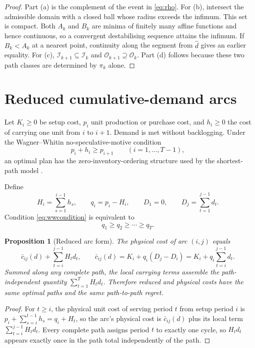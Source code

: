 \documentclass[11pt]{article}
\newtheorem{proposition}[theorem]{Proposition}
\theoremstyle{definition}
\newcommand{\cI}{\mathcal{I}}
\newcommand{\cO}{\mathcal{O}}
\newcommand{\dhat}{\widehat d}
\begin{document}
\begin{proof}
Part (a) is the complement of the event in \eqref{eq:rho}. For (b), intersect the admissible domain with a closed ball whose radius exceeds the infimum. This set is compact. Both $A_k$ and $B_k$ are minima of finitely many affine functions and hence continuous, so a convergent destabilising sequence attains the infimum. If $B_k<A_k$ at a nearest point, continuity along the segment from $\dhat$ gives an earlier equality. For (c), $\cI_{k+1}\subseteq\cI_k$ and $\cO_{k+1}\supseteq\cO_k$. Part (d) follows because these two path classes are determined by $\pi_k$ alone.
\end{proof}

\section{Reduced cumulative-demand arcs}\label{sec:reduction}

Let $K_i\ge0$ be setup cost, $p_i$ unit production or purchase cost, and $h_i\ge0$ the cost of carrying one unit from $i$ to $i+1$. Demand is met without backlogging. Under the Wagner--Whitin no-speculative-motive condition
\begin{equation}\label{eq:wwcondition}
p_i+h_i\ge p_{i+1}\qquad(i=1,\ldots,T-1),
\end{equation}
an optimal plan has the zero-inventory-ordering structure used by the shortest-path model \parencite{WagnerWhitin1958}.

Define
\[
H_i=\sum_{s=1}^{i-1}h_s,
\qquad q_i=p_i-H_i,
\qquad D_1=0,
\qquad D_j=\sum_{t=1}^{j-1}d_t.
\]
Condition \eqref{eq:wwcondition} is equivalent to
\begin{equation}\label{eq:orderedq}
q_1\ge q_2\ge\cdots\ge q_T.
\end{equation}

\begin{proposition}[Reduced arc form]\label{prop:reduction}
The physical cost of arc $(i,j)$ equals
\begin{equation}\label{eq:reducedarc}
\bar c_{ij}(d)+\sum_{t=i}^{j-1}H_td_t,
\qquad
\bar c_{ij}(d)=K_i+q_i(D_j-D_i)
=K_i+q_i\sum_{t=i}^{j-1}d_t.
\end{equation}
Summed along any complete path, the local carrying terms assemble the path-independent quantity $\sum_{t=1}^TH_td_t$. Therefore reduced and physical costs have the same optimal paths and the same path-to-path regret.
\end{proposition}

\begin{proof}
For $t\ge i$, the physical unit cost of serving period $t$ from setup period $i$ is
$p_i+\sum_{s=i}^{t-1}h_s=q_i+H_t$, so the arc's physical cost is $\bar c_{ij}(d)$ plus its local term $\sum_{t=i}^{j-1}H_td_t$. Every complete path assigns period $t$ to exactly one cycle, so $H_td_t$ appears exactly once in the path total independently of the path.
\end{proof}
\end{document}
